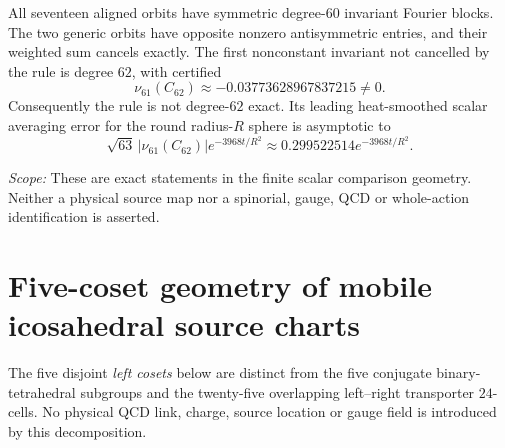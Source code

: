 \documentclass[11pt]{article}
\begin{document}
\begin{corollary}
\label{p1b:cor:cc112-first-alias62}
All seventeen aligned orbits have symmetric degree-$60$ invariant
Fourier blocks. The two generic orbits have opposite nonzero
antisymmetric entries, and their weighted sum cancels exactly. The
first nonconstant invariant not cancelled by the rule is degree $62$,
with certified
\[
 \nu_{61}(C_{62})\approx-0.03773628967837215\neq0.
\]
Consequently the rule is not degree-$62$ exact. Its leading
heat-smoothed scalar averaging error for the round radius-$R$ sphere
is asymptotic to
\[
 \sqrt{63}\,|\nu_{61}(C_{62})|e^{-3968t/R^2}
 \approx 0.299522514e^{-3968t/R^2}.
\]
\end{corollary}

\noindent\emph{Scope:} These are exact statements in the finite scalar
comparison geometry. Neither a physical source map nor a spinorial,
gauge, QCD or whole-action identification is asserted.


\begingroup
\small
\printbibliography
\endgroup

\section{Five-coset geometry of mobile icosahedral source charts}
\label{p1b:sec:v3023-five-coset-incidence}
The five disjoint \emph{left cosets} below are distinct from the five
conjugate binary-tetrahedral subgroups and the twenty-five overlapping
left--right transporter $24$-cells. No physical QCD link, charge,
source location or gauge field is introduced by this decomposition.
\end{document}
